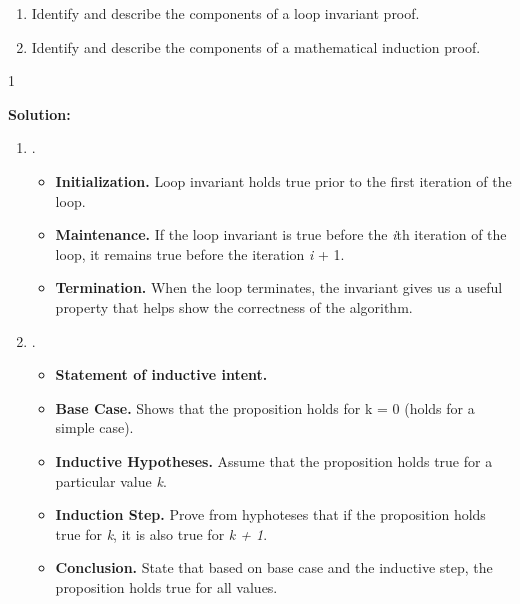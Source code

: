 \documentclass[9pt]{article}
\def\solutions{1}
\begin{document}
\item

\begin{enumerate}

\item Identify and describe the components of a loop invariant proof.
\item Identify and describe the components of a mathematical induction proof.
\end{enumerate}

  \if\solutions1
  \vspace{2mm}
  
  \textbf{Solution:}  

\begin{enumerate}
    \item .
\begin{itemize}
	\item \textbf{Initialization.} Loop invariant holds true prior to the first iteration of the loop.
	\item \textbf{Maintenance.} If the loop invariant is true before the \textit{i}th iteration of the loop, it remains true before the iteration \textit{i} + 1.
	\item \textbf{Termination.} When the loop terminates, the invariant gives us a useful property that helps show the correctness of the algorithm.
\end{itemize}
    \item .
    
    \begin{itemize}
        \item \textbf{Statement of inductive intent.}
        \item \textbf{Base Case.} Shows that the proposition holds for k = 0 (holds for a simple case).
        \item \textbf{Inductive Hypotheses.} Assume that the proposition holds true for a particular value \textit{k}.
        \item \textbf{Induction Step.} Prove from hyphoteses that if the proposition holds true for \textit{k}, it is also true for \textit{k + 1}.
        \item \textbf{Conclusion.} State that based on base case and the inductive step, the proposition holds true for all values.
    \end{itemize}

\end{enumerate}
\end{document}
